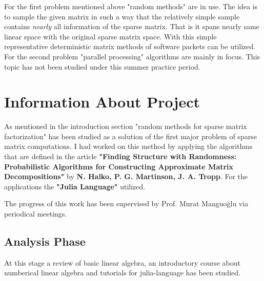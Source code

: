 \documentclass[11pt,a4paper]{article}
\theoremstyle{definition}
\begin{document}
		For the first problem mentioned above "random methods" are in use. The idea is to sample the given matrix in such a way that the relatively simple sample contains \textit{nearly} all information of the sparse matrix. That is it spans nearly same linear space with the original sparse matrix space. With this simple representative deterministic matrix methods of software packets can be utilized. For the second problem "parallel processing" algorithms are mainly in focus. This topic has not been studied under this summer practice period.
		
	\section{Information About Project}
	
	As mentioned in the introduction section "random methods for sparse matrix factorization" has been studied as a solution of the first major problem of sparse matrix computations. I had worked on this method by applying the algorithms that are defined in the article \textbf{"Finding Structure with Randomness: Probabilistic Algorithms for Constructing Approximate Matrix Decompositions"} by \textbf{N. Halko, P. G. Martinson, J. A. Tropp}. For the applications the \textbf{"Julia Language"} utilized.
	
	The progress of this work has been supervised by Prof. Murat Manguoğlu via periodical meetings. 
	
	\subsection{Analysis Phase}
	At this stage a review of basic linear algebra, an introductory course about numberical linear algebra and tutorials for julia-language has been studied.		
\end{document}
